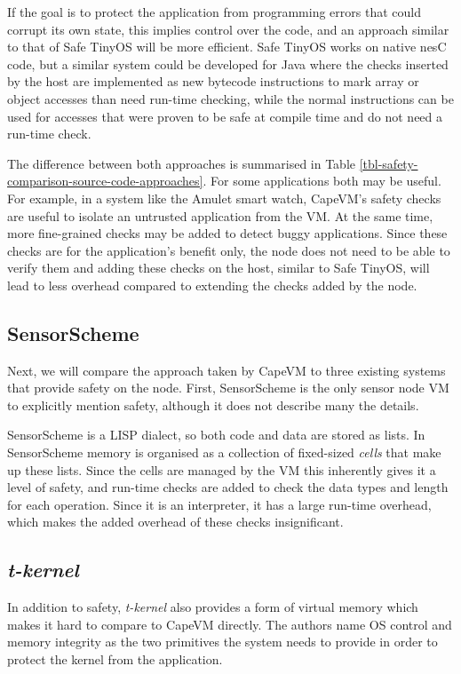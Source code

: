 If the goal is to protect the application from programming errors that could corrupt its own state, this implies control over the code, and an approach similar to that of Safe TinyOS will be more efficient. Safe TinyOS works on native nesC code, but a similar system could be developed for Java where the checks inserted by the host are implemented as new bytecode instructions to mark array or object accesses than need run-time checking, while the normal instructions can be used for accesses that were proven to be safe at compile time and do not need a run-time check.

The difference between both approaches is summarised in Table \ref{tbl-safety-comparison-source-code-approaches}. For some applications both may be useful. For example, in a system like the Amulet smart watch, CapeVM's safety checks are useful to isolate an untrusted application from the VM. At the same time, more fine-grained checks may be added to detect buggy applications. Since these checks are for the application's benefit only, the node does not need to be able to verify them and adding these checks on the host, similar to Safe TinyOS, will lead to less overhead compared to extending the checks added by the node.




\subsection{SensorScheme}
Next, we will compare the approach taken by CapeVM to three existing systems that provide safety on the node. First, SensorScheme is the only sensor node VM to explicitly mention safety, although it does not describe many the details.

SensorScheme is a LISP dialect, so both code and data are stored as lists. In SensorScheme memory is organised as a collection of fixed-sized \emph{cells} that make up these lists. Since the cells are managed by the VM this inherently gives it a level of safety, and run-time checks are added to check the data types and length for each operation. Since it is an interpreter, it has a large run-time overhead, which makes the added overhead of these checks insignificant.




\subsection{\emph{t-kernel}}
In addition to safety, \emph{t-kernel} \cite{Gu:2005un, Gu:2006ww} also provides a form of virtual memory which makes it hard to compare to CapeVM directly. The authors name OS control and memory integrity as the two primitives the system needs to provide in order to protect the kernel from the application.

